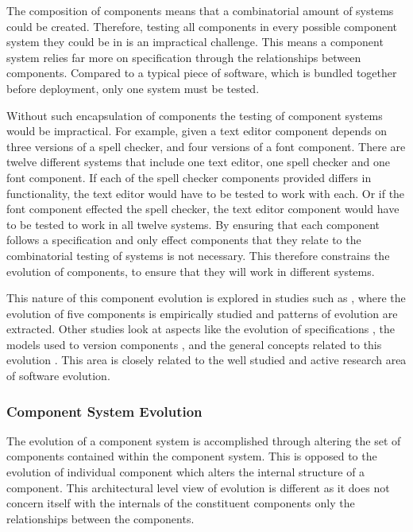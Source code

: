 The composition of components means that a combinatorial amount of systems could be created.
Therefore, testing all components in every possible component system they could be in is an impractical challenge.
This means a component system relies far more on specification through the relationships between components.
Compared to a typical piece of software, which is bundled together before deployment, only one system must be tested.

Without such encapsulation of components the testing of component systems would be impractical.
For example, given a text editor component depends on three versions of a spell checker, 
and four versions of a font component.
There are twelve different systems that include one text editor, one spell checker and one font component.
If each of the spell checker components provided differs in functionality, the text editor would have to be tested to work with each.
Or if the font component effected the spell checker, the text editor component would have to be tested to work in all twelve systems.
By ensuring that each component follows a specification and only effect components that they relate to the combinatorial testing of systems is not necessary.
This therefore constrains the evolution of components, to ensure that they will work in different systems.

This nature of this component evolution is explored in studies such as \cite{vasa2007patterns}, 
where the evolution of five components is empirically studied and patterns of evolution are extracted.
Other studies look at aspects like the evolution of specifications \cite{Mencl2001}, the models used to version components \cite{Stuckenholz2005},
and the general concepts related to this evolution \cite{Rhode2000}.
This area is closely related to the well studied and active research area of software evolution.

\subsubsection{Component System Evolution}
The evolution of a component system is accomplished through altering the set of components contained within the component system.
This is opposed to the evolution of individual component which alters the internal structure of a component.
This architectural level view of evolution is different as it does not concern itself with the internals of the constituent components only the relationships between the components.

